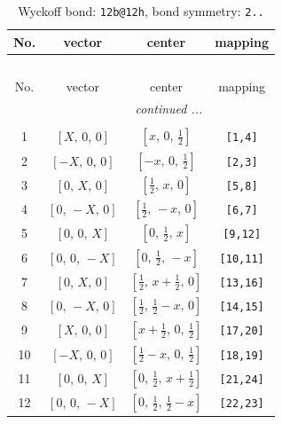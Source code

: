 \documentclass[fleqn,8pt]{jsarticle}
\begin{document}
\renewcommand{\arraystretch}{1.2}
\begin{longtable}{cccc}
\caption{Wyckoff bond: {\tt 12b@12h}, bond symmetry: {\tt 2..}}
 \\
 \hline \hline
No. & vector & center & mapping \\ \hline \endfirsthead

\multicolumn{3}{l}{\tablename\ \thetable{}} \\
 \hline \hline
No. & vector & center & mapping \\ \hline \endhead

 \hline \hline
\multicolumn{3}{r}{\footnotesize\it continued ...} \\ \endfoot

 \hline \hline
\multicolumn{3}{r}{} \\ \endlastfoot

1 & $\left[ X,\, 0,\, 0 \right]$ & $\left[ x,\, 0,\, \frac{1}{2} \right]$ & {\tt [1,4]} \\ \hline
2 & $\left[ - X,\, 0,\, 0 \right]$ & $\left[ - x,\, 0,\, \frac{1}{2} \right]$ & {\tt [2,3]} \\ \hline
3 & $\left[ 0,\, X,\, 0 \right]$ & $\left[ \frac{1}{2},\, x,\, 0 \right]$ & {\tt [5,8]} \\ \hline
4 & $\left[ 0,\, - X,\, 0 \right]$ & $\left[ \frac{1}{2},\, - x,\, 0 \right]$ & {\tt [6,7]} \\ \hline
5 & $\left[ 0,\, 0,\, X \right]$ & $\left[ 0,\, \frac{1}{2},\, x \right]$ & {\tt [9,12]} \\ \hline
6 & $\left[ 0,\, 0,\, - X \right]$ & $\left[ 0,\, \frac{1}{2},\, - x \right]$ & {\tt [10,11]} \\ \hline
7 & $\left[ 0,\, X,\, 0 \right]$ & $\left[ \frac{1}{2},\, x + \frac{1}{2},\, 0 \right]$ & {\tt [13,16]} \\ \hline
8 & $\left[ 0,\, - X,\, 0 \right]$ & $\left[ \frac{1}{2},\, \frac{1}{2} - x,\, 0 \right]$ & {\tt [14,15]} \\ \hline
9 & $\left[ X,\, 0,\, 0 \right]$ & $\left[ x + \frac{1}{2},\, 0,\, \frac{1}{2} \right]$ & {\tt [17,20]} \\ \hline
10 & $\left[ - X,\, 0,\, 0 \right]$ & $\left[ \frac{1}{2} - x,\, 0,\, \frac{1}{2} \right]$ & {\tt [18,19]} \\ \hline
11 & $\left[ 0,\, 0,\, X \right]$ & $\left[ 0,\, \frac{1}{2},\, x + \frac{1}{2} \right]$ & {\tt [21,24]} \\ \hline
12 & $\left[ 0,\, 0,\, - X \right]$ & $\left[ 0,\, \frac{1}{2},\, \frac{1}{2} - x \right]$ & {\tt [22,23]} \\
\end{longtable}
\end{document}
